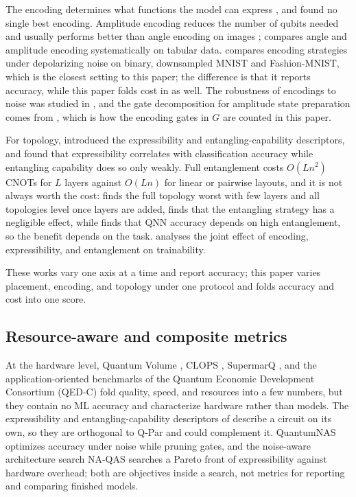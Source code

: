 \documentclass{ieeeaccess}
\begin{document}
The encoding determines what functions the model can express \cite{schuld2021encoding}, and \cite{mattern2021vqnn} found no single best encoding. Amplitude encoding reduces the number of qubits needed \cite{fan2023hybrid} and usually performs better than angle encoding on images \cite{kabir2025lhqnn}; \cite{tudisco2026encoding} compares angle and amplitude encoding systematically on tabular data. \cite{feng2025encoding} compares encoding strategies under depolarizing noise on binary, downsampled MNIST and Fashion-MNIST, which is the closest setting to this paper; the difference is that it reports accuracy, while this paper folds cost in as well. The robustness of encodings to noise was studied in \cite{larose2020robust}, and the gate decomposition for amplitude state preparation comes from \cite{mottonen2005ucr}, which is how the encoding gates in $G$ are counted in this paper.

For topology, \cite{sim2019expressibility} introduced the expressibility and entangling-capability descriptors, and \cite{hubregtsen2021evaluation} found that expressibility correlates with classification accuracy while entangling capability does so only weakly. Full entanglement costs $O(Ln^2)$ CNOTs for $L$ layers against $O(Ln)$ for linear or pairwise layouts, and it is not always worth the cost: \cite{mordacci2025topologies} finds the full topology worst with few layers and all topologies level once layers are added, \cite{herbst2024hyperparameters} finds that the entangling strategy has a negligible effect, while \cite{nakhl2024entanglement} finds that QNN accuracy depends on high entanglement, so the benefit depends on the task. \cite{kashif2023unified} analyses the joint effect of encoding, expressibility, and entanglement on trainability.

These works vary one axis at a time and report accuracy; this paper varies placement, encoding, and topology under one protocol and folds accuracy and cost into one score.

\subsection{Resource-aware and composite metrics}
\label{sec:rw-metrics}

At the hardware level, Quantum Volume \cite{cross2019qv}, CLOPS \cite{wack2021clops}, SupermarQ \cite{tomesh2022supermarq}, and the application-oriented benchmarks of the Quantum Economic Development Consortium (QED-C) \cite{lubinski2023benchmarks} fold quality, speed, and resources into a few numbers, but they contain no ML accuracy and characterize hardware rather than models. The expressibility and entangling-capability descriptors of \cite{sim2019expressibility} describe a circuit on its own, so they are orthogonal to Q-Par and could complement it. QuantumNAS \cite{wang2022quantumnas} optimizes accuracy under noise while pruning gates, and the noise-aware architecture search NA-QAS \cite{li2026naqas} searches a Pareto front of expressibility against hardware overhead; both are objectives inside a search, not metrics for reporting and comparing finished models.
\end{document}
